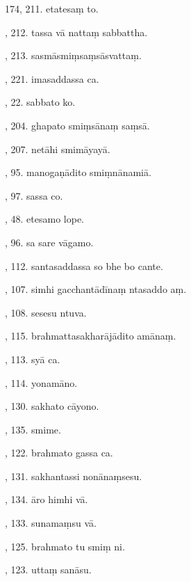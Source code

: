 174, 211. etatesaṃ to.\hfill \pageref{sut:174}\par {}, 212. tassa vā nattaṃ sabbattha.\hfill \pageref{sut:175}\par {}, 213. sasmāsmiṃsaṃsāsvattaṃ.\hfill \pageref{sut:176}\par {}, 221. imasaddassa ca.\hfill \pageref{sut:177}\par {}, 22. sabbato ko.\hfill \pageref{sut:178}\par {}, 204. ghapato smiṃsānaṃ saṃsā.\hfill \pageref{sut:179}\par {}, 207. netāhi smimāyayā.\hfill \pageref{sut:180}\par {}, 95. manogaṇādito smiṃnānamiā.\hfill \pageref{sut:181}\par {}, 97. sassa co.\hfill \pageref{sut:182}\par {}, 48. etesamo lope.\hfill \pageref{sut:183}\par {}, 96. sa sare vāgamo.\hfill \pageref{sut:184}\par {}, 112. santasaddassa so bhe bo cante.\hfill \pageref{sut:185}\par {}, 107. simhi gacchantādīnaṃ ntasaddo aṃ.\hfill \pageref{sut:186}\par {}, 108. sesesu ntuva.\hfill \pageref{sut:187}\par {}, 115. brahmattasakharājādito amānaṃ.\hfill \pageref{sut:188}\par {}, 113. syā ca.\hfill \pageref{sut:189}\par {}, 114. yonamāno.\hfill \pageref{sut:190}\par {}, 130. sakhato cāyono.\hfill \pageref{sut:191}\par {}, 135. smime.\hfill \pageref{sut:192}\par {}, 122. brahmato gassa ca.\hfill \pageref{sut:193}\par {}, 131. sakhantassi nonānaṃsesu.\hfill \pageref{sut:194}\par {}, 134. āro himhi vā.\hfill \pageref{sut:195}\par {}, 133. sunamaṃsu vā.\hfill \pageref{sut:196}\par {}, 125. brahmato tu smiṃ ni.\hfill \pageref{sut:197}\par {}, 123. uttaṃ sanāsu.\hfill \pageref{sut:198}\par \noindent
